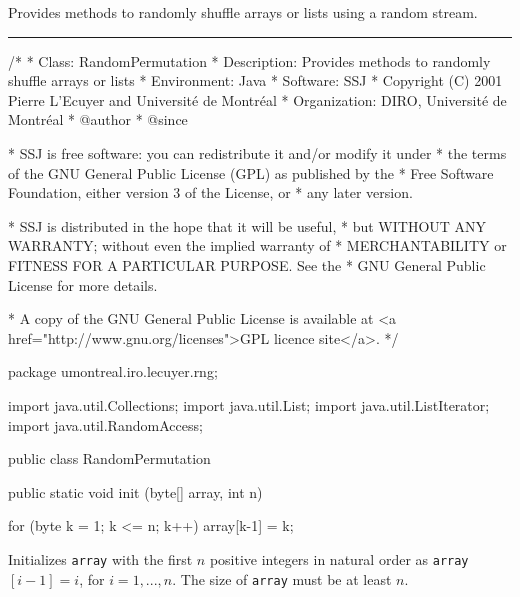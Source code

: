
Provides methods to randomly shuffle arrays
or lists using a random stream.


\bigskip\hrule

\begin{code}
\begin{hide}
/*
 * Class:        RandomPermutation
 * Description:  Provides methods to randomly shuffle arrays or lists
 * Environment:  Java
 * Software:     SSJ 
 * Copyright (C) 2001  Pierre L'Ecuyer and Université de Montréal
 * Organization: DIRO, Université de Montréal
 * @author       
 * @since

 * SSJ is free software: you can redistribute it and/or modify it under
 * the terms of the GNU General Public License (GPL) as published by the
 * Free Software Foundation, either version 3 of the License, or
 * any later version.

 * SSJ is distributed in the hope that it will be useful,
 * but WITHOUT ANY WARRANTY; without even the implied warranty of
 * MERCHANTABILITY or FITNESS FOR A PARTICULAR PURPOSE.  See the
 * GNU General Public License for more details.

 * A copy of the GNU General Public License is available at
   <a href="http://www.gnu.org/licenses">GPL licence site</a>.
 */
\end{hide}
package umontreal.iro.lecuyer.rng;\begin{hide}

import java.util.Collections;
import java.util.List;
import java.util.ListIterator;
import java.util.RandomAccess;
\end{hide}

public class RandomPermutation\begin{hide} {
   private static final int SHUFFLE_THRESHOLD = 5;
\end{hide}

   public static void init (byte[] array, int n)\begin{hide} {
      for (byte k = 1; k <= n; k++)
         array[k-1] = k;
   }\end{hide}
\end{code}
\begin{tabb} Initializes \texttt{array} with the first $n$
  positive integers in natural order as \texttt{array}$[i-1] = i$, for
  $i=1,...,n$.  The size of \texttt{array} must be at least $n$.
\end{tabb}
\begin{htmlonly}
\end{htmlonly}
